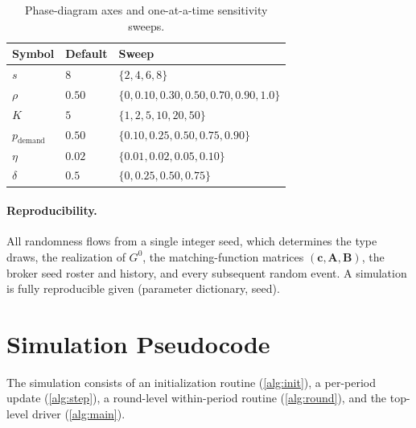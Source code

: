 \documentclass[11pt]{article}
\providecommand{\cref}[1]{\ref{#1}}
\newcommand{\A}{\mathbf{A}}
\newcommand{\B}{\mathbf{B}}
\begin{document}
\begin{table}[h]
\centering
\caption{Phase-diagram axes and one-at-a-time sensitivity sweeps.}\label{tab:sweeps}
\small
\begin{tabular}{@{}lll@{}}
\toprule
\textbf{Symbol} & \textbf{Default} & \textbf{Sweep}\\
\midrule
$s$ & $8$ & $\{2,4,6,8\}$\\
$\rho$ & $0.50$ & $\{0,0.10,0.30,0.50,0.70,0.90,1.0\}$\\
$K$ & $5$ & $\{1,2,5,10,20,50\}$\\
$p_{\text{demand}}$ & $0.50$ & $\{0.10,0.25,0.50,0.75,0.90\}$\\
$\eta$ & $0.02$ & $\{0.01,0.02,0.05,0.10\}$\\
$\delta$ & $0.5$ & $\{0,0.25,0.50,0.75\}$\\
\bottomrule
\end{tabular}
\end{table}

\paragraph{Reproducibility.} All randomness flows from a single integer seed, which determines the type draws, the realization of $G^0$, the matching-function matrices $(\mathbf{c},\A,\B)$, the broker seed roster and history, and every subsequent random event. A simulation is fully reproducible given (parameter dictionary, seed).

\section{Simulation Pseudocode}\label{sec:pseudo}

The simulation consists of an initialization routine (\cref{alg:init}), a per-period update (\cref{alg:step}), a round-level within-period routine (\cref{alg:round}), and the top-level driver (\cref{alg:main}).
\end{document}
